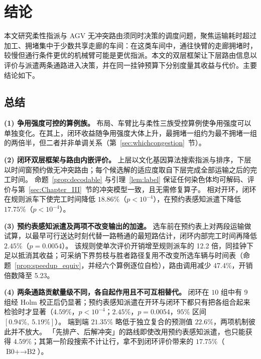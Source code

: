 \documentclass[manuscript,screen,review]{acmart}
\newcommand{\NCases}{10}
\newcommand{\GainLoopRule}{18.86\%}      %
\newcommand{\PLoopRule}{<10^{-4}}
\newcommand{\GainLoopProbe}{17.75\%}     %
\newcommand{\PLoopProbe}{<10^{-4}}
\newcommand{\GainProbeOpen}{4.59\%}      %
\newcommand{\PProbeOpen}{<10^{-4}}
\newcommand{\GainProbeLoop}{2.45\%}      %
\newcommand{\PProbeLoop}{=0.0054}
\newcommand{\GainEndToEnd}{21.35\%}      %
\newcommand{\CIProbeLoop}{$[0.94\%,\ 5.19\%]$}
\newcommand{\GainIndepProduct}{22.6\%}
\newcommand{\CellsSigLoopAdj}{9}
\newcommand{\RouteCallCut}{47.4\%}
\newcommand{\CostMultBefore}{12.2}
\newcommand{\CostMultAfter}{5.23}
\begin{document}
\section{结论}

本文研究柔性指派与 AGV 无冲突路由须同时决策的调度问题，聚焦运输耗时超过加工、拥堵集中于少数共享走廊的车间：在这类车间中，通往快臂的走廊拥堵时，较慢但通行条件更优的机械臂可能是更优指派。本文的双层框架让下层路由信息以评价与派遣两条通路进入决策，并在同一挂钟预算下分别度量其收益与代价。主要结论如下。


\subsection{总结}
\label{sec:contributions}

\textbf{(1) 争用强度可控的算例族。}
布局、车臂比与柔性三族受控算例使争用强度可以单独变化。在其上，闭环收益随争用强度大体上升，最拥堵一组约为最不拥堵一组的两倍半，但二者并非单调关系（第~\ref{sec:whichcongestion}~节）。

\textbf{(2) 闭环双层框架与路由内嵌评价。}
上层以文化基因算法搜索指派与排序，下层以时间窗预约做无冲突路由；每个候选解的适应度取自下层完成全部运输之后的完工时间。
命题~\ref{prop:decodable} 与引理~\ref{lem:label} 保证任何染色体均可解码、评价与第~\ref{sec:Chapter_III}~节的冲突模型一致，且无需修复算子。
相对开环，闭环在规则派车下使完工时间降低 $\GainLoopRule$（$p\PLoopRule$），在预约表感知派遣下降低 $\GainLoopProbe$（$p\PLoopProbe$）。

\textbf{(3) 预约表感知派遣及两项不改变输出的加速。}
选车前在预约表上对两段运输做试算，以最早可行送达时刻代替一路畅通的最短路估计，闭环内部完工时间再降低 $\GainProbeLoop$（$p\PProbeLoop$）。
该规则使单次评价开销增至规则派车的 \CostMultBefore{} 倍，同挂钟下足以抵消其收益；可采纳下界剪枝与胜者路径复用不改变所选车辆与时间表（命题~\ref{prop:speedup_equiv}，并经六个算例逐位自检），路由调用减少 \RouteCallCut{}，开销倍数降至 \CostMultAfter{}。

\textbf{(4) 两条通路贡献量级不同，各自起作用且不可互相替代。}
闭环在 $\NCases$ 组中有 \CellsSigLoopAdj{} 组经 Holm 校正后仍显著；预约表感知派遣在开环与闭环下都只有把各组合起来检验时才显著（$\GainProbeOpen$，$p\PProbeOpen$；$\GainProbeLoop$，$p\PProbeLoop$，$95\%$ 区间 \CIProbeLoop{}）。
端到端 $\GainEndToEnd$ 略低于独立复合的预测值 $\GainIndepProduct$，两项机制彼此并不放大。
「先排产、后解冲突」的路线即使改用预约表感知派遣，也只能获得 $\GainProbeOpen$；其第一阶段搜索不计让行，拿不到闭环评价带来的 $\GainLoopProbe$（$\text{B0+}\to\text{B2}$）。
\end{document}
